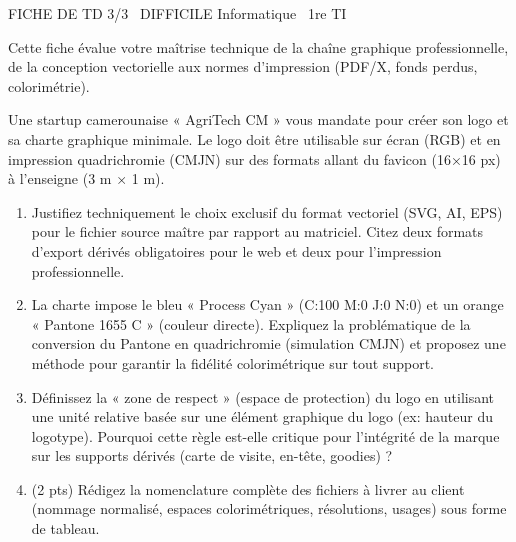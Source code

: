 \documentclass[11pt]{article}
\begin{document}
\begin{tcolorbox}[enhanced,colback=popink,colframe=popink,arc=10pt,boxrule=0pt,left=12pt,right=12pt,top=9pt,bottom=9pt]
{\color{white}\popxbold\small FICHE DE TD 3/3 \textbullet\ DIFFICILE \hfill Informatique \textbullet\ 1re TI\par}
\end{tcolorbox}
\vspace{4pt}
Cette fiche évalue votre maîtrise technique de la chaîne graphique professionnelle, de la conception vectorielle aux normes d'impression (PDF/X, fonds perdus, colorimétrie).

\begin{exercice}
Une startup camerounaise « AgriTech CM » vous mandate pour créer son logo et sa charte graphique minimale. Le logo doit être utilisable sur écran (RGB) et en impression quadrichromie (CMJN) sur des formats allant du favicon (16×16 px) à l'enseigne (3 m × 1 m).

\begin{enumerate}
    \item Justifiez techniquement le choix exclusif du format vectoriel (SVG, AI, EPS) pour le fichier source maître par rapport au matriciel. Citez deux formats d'export dérivés obligatoires pour le web et deux pour l'impression professionnelle.
    \item La charte impose le bleu « Process Cyan » (C:100 M:0 J:0 N:0) et un orange « Pantone 1655 C » (couleur directe). Expliquez la problématique de la conversion du Pantone en quadrichromie (simulation CMJN) et proposez une méthode pour garantir la fidélité colorimétrique sur tout support.
    \item Définissez la « zone de respect » (espace de protection) du logo en utilisant une unité relative basée sur une élément graphique du logo (ex: hauteur du logotype). Pourquoi cette règle est-elle critique pour l'intégrité de la marque sur les supports dérivés (carte de visite, en-tête, goodies) ?
    \item (2 pts) Rédigez la nomenclature complète des fichiers à livrer au client (nommage normalisé, espaces colorimétriques, résolutions, usages) sous forme de tableau.
\end{enumerate}
\end{exercice}
\end{document}
